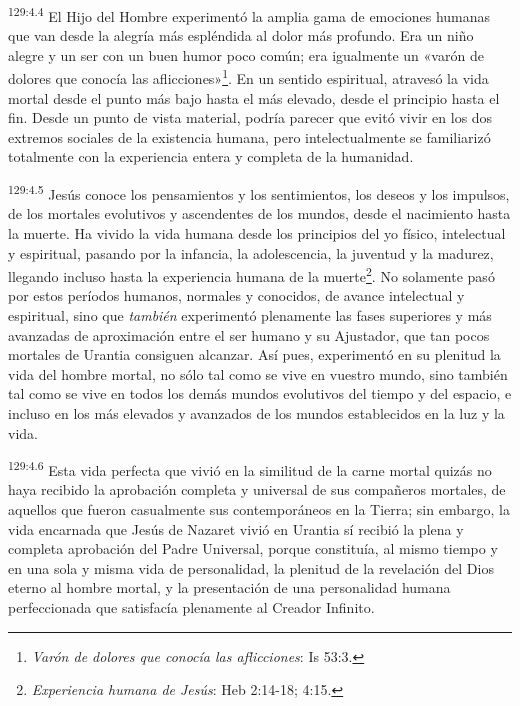 \par 
\textsuperscript{129:4.4} El Hijo del Hombre experimentó la amplia gama de emociones humanas que van desde la alegría más espléndida al dolor más profundo. Era un niño alegre y un ser con un buen humor poco común; era igualmente un «varón de dolores que conocía las aflicciones»\footnote{\textit{Varón de dolores que conocía las aflicciones}: Is 53:3.}. En un sentido espiritual, atravesó la vida mortal desde el punto más bajo hasta el más elevado, desde el principio hasta el fin. Desde un punto de vista material, podría parecer que evitó vivir en los dos extremos sociales de la existencia humana, pero intelectualmente se familiarizó totalmente con la experiencia entera y completa de la humanidad.

\par 
\textsuperscript{129:4.5} Jesús conoce los pensamientos y los sentimientos, los deseos y los impulsos, de los mortales evolutivos y ascendentes de los mundos, desde el nacimiento hasta la muerte. Ha vivido la vida humana desde los principios del yo físico, intelectual y espiritual, pasando por la infancia, la adolescencia, la juventud y la madurez, llegando incluso hasta la experiencia humana de la muerte\footnote{\textit{Experiencia humana de Jesús}: Heb 2:14-18; 4:15.}. No solamente pasó por estos períodos humanos, normales y conocidos, de avance intelectual y espiritual, sino que \textit{también} experimentó plenamente las fases superiores y más avanzadas de aproximación entre el ser humano y su Ajustador, que tan pocos mortales de Urantia consiguen alcanzar. Así pues, experimentó en su plenitud la vida del hombre mortal, no sólo tal como se vive en vuestro mundo, sino también tal como se vive en todos los demás mundos evolutivos del tiempo y del espacio, e incluso en los más elevados y avanzados de los mundos establecidos en la luz y la vida.

\par 
\textsuperscript{129:4.6} Esta vida perfecta que vivió en la similitud de la carne mortal quizás no haya recibido la aprobación completa y universal de sus compañeros mortales, de aquellos que fueron casualmente sus contemporáneos en la Tierra; sin embargo, la vida encarnada que Jesús de Nazaret vivió en Urantia sí recibió la plena y completa aprobación del Padre Universal, porque constituía, al mismo tiempo y en una sola y misma vida de personalidad, la plenitud de la revelación del Dios eterno al hombre mortal, y la presentación de una personalidad humana perfeccionada que satisfacía plenamente al Creador Infinito.

